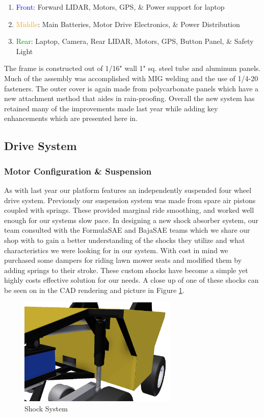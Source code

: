 \begin{enumerate}
\item \textcolor{blue}{Front}: Forward LIDAR, Motors, GPS, \& Power support for laptop
\item \textcolor{Orange}{Middle}: Main Batteries, Motor Drive Electronics, \& Power Distribution
\item \textcolor{green}{Rear}: Laptop, Camera, Rear LIDAR, Motors, GPS, Button Panel, \& Safety Light
\end{enumerate}

The frame is constructed out of 1/16" wall 1" sq. steel tube and aluminum panels. Much of the assembly was accomplished with MIG welding and the use of 1/4-20 fasteners. The outer cover is again made from polycarbonate panels which have a new attachment method that aides in rain-proofing. Overall the new system has retained many of the improvements made last year while adding key enhancements which are presented here in. 

\subsection{Drive System}
\subsubsection{Motor Configuration \& Suspension}
As with last year our platform features an independently suspended four wheel drive system. Previously our suspension system was made from spare air pistons coupled with springs. These provided marginal ride smoothing, and worked well enough for our systems slow pace. In designing a new shock absorber system, our team consulted with the FormulaSAE and BajaSAE teams which we share our shop with to gain a better understanding of the shocks they utilize and what characteristics we were looking for in our system. With cost in mind we purchased some dampers for riding lawn mower seats and modified them by adding springs to their stroke. These custom shocks have become a simple yet highly costs effective solution for our needs. A close up of one of these shocks can be seen on in the CAD rendering and picture in Figure \ref{FIG:Shock}.

\begin{figure}[H]
\begin{center}
\includegraphics[width=3in]{./pics/shock.png}
\caption{Shock System}
\label{FIG:Shock}
\end{center}
\end{figure}

